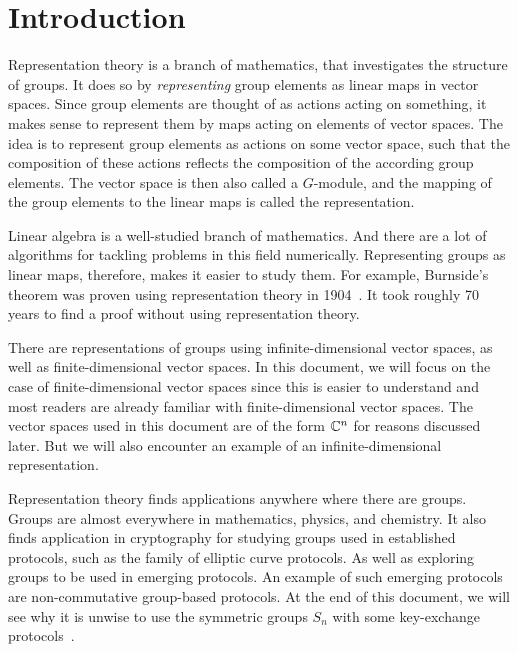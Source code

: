 \section{Introduction}

Representation theory is a branch of mathematics, that investigates the structure of groups.
It does so by \textit{representing} group elements as linear maps in vector spaces.
Since group elements are thought of as actions acting on something, it makes sense to represent them by maps acting on elements of vector spaces.
The idea is to represent group elements as actions on some vector space, such that the composition of these actions reflects the composition of the according group elements.
The vector space is then also called a $G$-module, and the mapping of the group elements to the linear maps is called the representation.

Linear algebra is a well-studied branch of mathematics.
And there are a lot of algorithms for tackling problems in this field numerically.
Representing groups as linear maps, therefore, makes it easier to study them.
For example, Burnside's theorem was proven using representation theory in 1904~\cite{burnside1904groups}.
It took roughly 70 years to find a proof without using representation theory.

There are representations of groups using infinite-dimensional vector spaces, as well as finite-dimensional vector spaces.
In this document, we will focus on the case of finite-dimensional vector spaces since this is easier to understand and most readers are already familiar with finite-dimensional vector spaces.
The vector spaces used in this document are of the form $\mathbb{C}^n$ for reasons discussed later.
But we will also encounter an example of an infinite-dimensional representation.

Representation theory finds applications anywhere where there are groups.
Groups are almost everywhere in mathematics, physics, and chemistry.
It also finds application in cryptography for studying groups used in established protocols, such as the family of elliptic curve protocols.
As well as exploring groups to be used in emerging protocols.
An example of such emerging protocols are non-commutative group-based protocols.
At the end of this document, we will see why it is unwise to use the symmetric groups $S_n$ with some key-exchange protocols~\cite{khovanov2022monoidal}.
